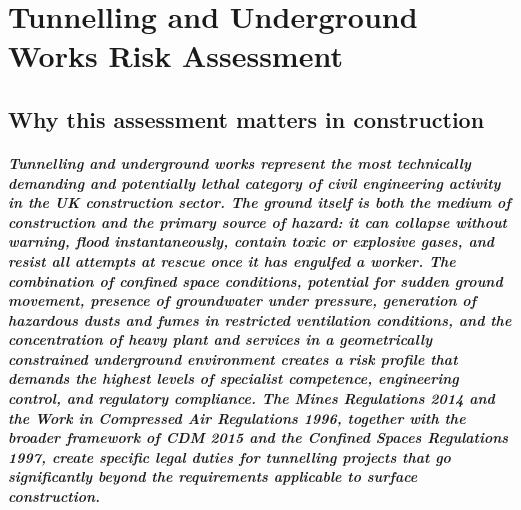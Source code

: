 \chapter{Tunnelling and Underground Works Risk Assessment}
\label{chap:Tunnelling and Underground Works Risk Assessment}

\section{Why this assessment matters in construction}

\paragraph{Tunnelling and underground works represent the most technically demanding and potentially lethal category of civil engineering activity in the UK construction sector. The ground itself is both the medium of construction and the primary source of hazard: it can collapse without warning, flood instantaneously, contain toxic or explosive gases, and resist all attempts at rescue once it has engulfed a worker. The combination of confined space conditions, potential for sudden ground movement, presence of groundwater under pressure, generation of hazardous dusts and fumes in restricted ventilation conditions, and the concentration of heavy plant and services in a geometrically constrained underground environment creates a risk profile that demands the highest levels of specialist competence, engineering control, and regulatory compliance. The Mines Regulations 2014 and the Work in Compressed Air Regulations 1996, together with the broader framework of CDM 2015 and the Confined Spaces Regulations 1997, create specific legal duties for tunnelling projects that go significantly beyond the requirements applicable to surface construction.}

